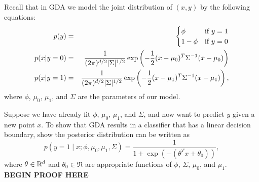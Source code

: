 \item {}
Recall that in GDA we model the joint distribution of $(x, y)$ by the following
equations:
%
\begin{eqnarray*}
	p(y) &=& \begin{cases}
	\phi & \mbox{if~} y = 1 \\
	1 - \phi & \mbox{if~} y = 0 \end{cases} \\
	p(x | y=0) &=& \frac{1}{(2\pi)^{{d}/2} |\Sigma|^{1/2}}
		\exp\left(-\frac{1}{2}(x-\mu_{0})^T \Sigma^{-1} (x-\mu_{0})\right) \\
	p(x | y=1) &=& \frac{1}{(2\pi)^{{d}/2} |\Sigma|^{1/2}}
		\exp\left(-\frac{1}{2}(x-\mu_1)^T \Sigma^{-1} (x-\mu_1) \right),
\end{eqnarray*}
%
where $\phi$, $\mu_0$, $\mu_1$, and $\Sigma$ are the parameters of our model.

Suppose we have already fit $\phi$, $\mu_0$, $\mu_1$, and $\Sigma$, and now
want to predict $y$ given a new point $x$. To show that GDA results in a
classifier that has a linear decision boundary, show the posterior distribution
can be written as
%
\begin{equation*}
	p(y = 1\mid x; \phi, \mu_0, \mu_1, \Sigma)
	= \frac{1}{1 + \exp(-(\theta^T x + \theta_0))},
\end{equation*}
%
where $\theta\in{\mathbb R}^{d}$ and $\theta_{0}\in\Re$ are appropriate functions of
$\phi$, $\Sigma$, $\mu_0$, and $\mu_1$.\\

{\bf BEGIN PROOF HERE}\\


